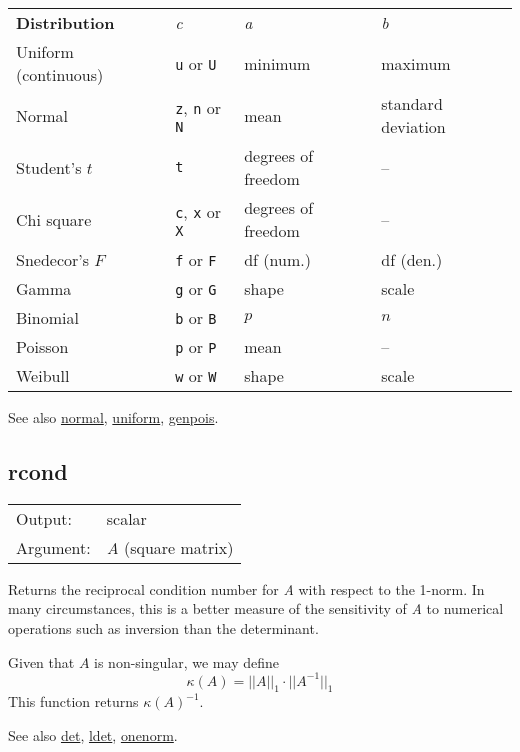 	  \begin{center}
	  \begin{tabular}{llll}
	  \textbf{Distribution} & \textsl{c} & \textsl{a} & \textsl{b} \\[4pt]
	  Uniform (continuous) & \texttt{u} or \texttt{U} & minimum & maximum\\
	  Normal & \texttt{z}, \texttt{n} or \texttt{N} & mean & standard deviation\\
	  Student's $t$ & \texttt{t} & degrees of freedom & --\\
	  Chi square & \texttt{c}, \texttt{x} or \texttt{X} & degrees of freedom & --\\
	  Snedecor's $F$ & \texttt{f} or \texttt{F} & df (num.) & df (den.)\\
	  Gamma & \texttt{g} or \texttt{G} & shape & scale \\
	  Binomial & \texttt{b} or \texttt{B} & $p$ & $n$ \\
	  Poisson & \texttt{p} or \texttt{P} & mean & -- \\
	  Weibull & \texttt{w} or \texttt{W} & shape & scale
	  \end{tabular}
	  \end{center}

	  See also \hyperlink{func-normal}{normal}, \hyperlink{func-uniform}{uniform}, \hyperlink{func-genpois}{genpois}.

\subsection{rcond}
\hypertarget{func-rcond}{}

\begin{tabular}{ll}
Output:     & scalar\\
Argument:   & \textsl{A} (square matrix)\\
\end{tabular}

	  Returns the reciprocal condition number for \textsl{A}
	  with respect to the 1-norm.  In many circumstances, this is a better
	  measure of the sensitivity of \textsl{A} to numerical
	  operations such as inversion than the determinant.

	  Given that \ensuremath{A} is non-singular, we may define
	  \[\kappa(A) = ||A||_1 \cdot ||A^{-1}||_1\] 
	  This function returns $\kappa(A)^{-1}$.

	  See also \hyperlink{func-det}{det}, \hyperlink{func-ldet}{ldet}, \hyperlink{func-onenorm}{onenorm}.

